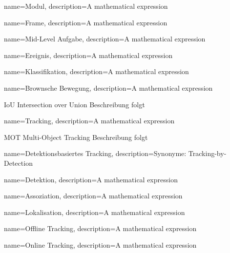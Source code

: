 
{
        name=Modul,
        description={A mathematical expression}
}

{
        name=Frame,
        description={A mathematical expression}
}

{
        name=Mid-Level Aufgabe,
        description={A mathematical expression}
}

{
        name=Ereignis,
        description={A mathematical expression}
}

{
        name=Klassifikation,
        description={A mathematical expression}
}

{
        name=Brownsche Bewegung,
        description={A mathematical expression}
}

\newglossaryentrywithacronym
{IoU}
{Intersection over Union}
{Beschreibung folgt}


{
        name=Tracking,
        description={A mathematical expression}
}

\newglossaryentrywithacronym
{MOT}
{Multi-Object Tracking}
{Beschreibung folgt}

{
        name=Detektionsbasiertes Tracking,
        description={Synonyme: Tracking-by-Detection}
}

{
        name=Detektion,
        description={A mathematical expression}
}

{
        name=Assoziation,
        description={A mathematical expression}
}

{
        name=Lokalisation,
        description={A mathematical expression}
}

{
        name=Offline Tracking,
        description={A mathematical expression}
}

{
        name=Online Tracking,
        description={A mathematical expression}
}

